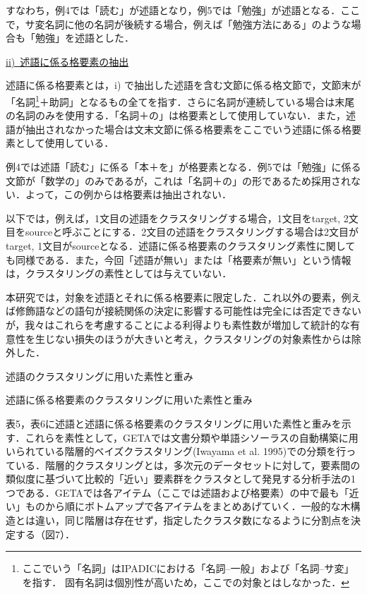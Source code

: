 \documentclass[japanese]{jnlp_1.4}
\begin{document}
すなわち，例4では「読む」が述語となり，例5では「勉強」が述語となる．ここで，サ変名詞に他の名詞が後続する場合，例えば「勉強方法にある」のような場合も「勉強」を述語とした．

\noindent
\ul{\mbox{ii) 述語に係る格要素の抽出}}

述語に係る格要素とは，i) で抽出した述語を含む文節に係る格文節で，文節末が「名詞\footnote{
	ここでいう「名詞」はIPADICにおける「名詞--一般」および「名詞--サ変」を指す．
	固有名詞は個別性が高いため，ここでの対象とはしなかった．
}＋助詞」となるもの全てを指す．さらに名詞が連続している場合は末尾の名詞のみを使用する．「名詞＋の」は格要素として使用していない．また，述語が抽出されなかった場合は文末文節に係る格要素をここでいう述語に係る格要素として使用している．

例4では述語「読む」に係る「本＋を」が格要素となる．例5では「勉強」に係る文節が「数学の」のみであるが，これは「名詞＋の」の形であるため採用されない．よって，この例からは格要素は抽出されない．

以下では，例えば，1文目の述語をクラスタリングする場合，1文目をtarget, 2文目をsourceと呼ぶことにする．2文目の述語をクラスタリングする場合は2文目がtarget, 1文目がsourceとなる．述語に係る格要素のクラスタリング素性に関しても同様である．また，今回「述語が無い」または「格要素が無い」という情報は，クラスタリングの素性としては与えていない．

本研究では，対象を述語とそれに係る格要素に限定した．これ以外の要素，例えば修飾語などの語句が接続関係の決定に影響する可能性は完全には否定できないが，我々はこれらを考慮することによる利得よりも素性数が増加して統計的な有意性を生じない損失のほうが大きいと考え，クラスタリングの対象素性からは除外した．

\begin{table}[t]
\caption{述語のクラスタリングに用いた素性と重み}

\end{table}
\begin{table}[t]
\caption{述語に係る格要素のクラスタリングに用いた素性と重み}

\end{table}


表5，表6に述語と述語に係る格要素のクラスタリングに用いた素性と重みを示す．これらを素性として，GETAでは文書分類や単語シソーラスの自動構築に用いられている階層的ベイズクラスタリング(Iwayama et al. 1995)での分類を行っている．階層的クラスタリングとは，多次元のデータセットに対して，要素間の類似度に基づいて比較的「近い」要素群をクラスタとして発見する分析手法の1つである．GETAでは各アイテム（ここでは述語および格要素）の中で最も「近い」ものから順にボトムアップで各アイテムをまとめあげていく．一般的な木構造とは違い，同じ階層は存在せず，指定したクラスタ数になるように分割点を決定する（図7）．
\end{document}
